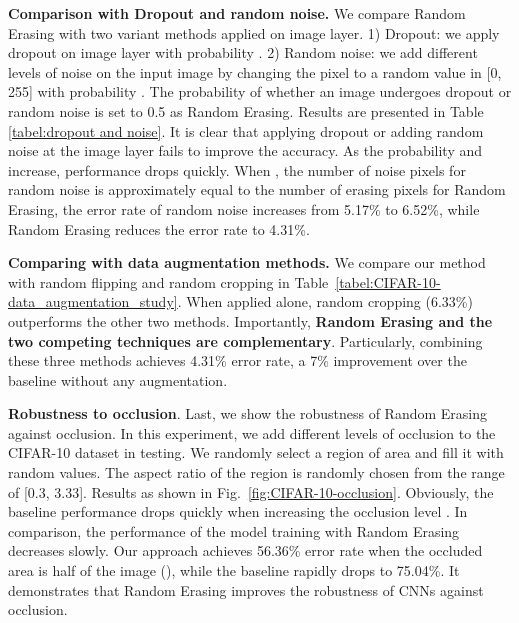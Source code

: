 \documentclass[10pt,twocolumn,letterpaper]{article}
\begin{document}
\textbf{Comparison with Dropout and random noise.} 
We compare Random Erasing with two variant methods applied on image layer. 1) Dropout: we apply dropout on image layer with probability . 2) Random noise: we add different levels of noise on the input image by changing the pixel to a random value in [0, 255] with probability . The probability of whether an image undergoes dropout or random noise is set to 0.5 as Random Erasing. Results are presented in Table \ref{tabel:dropout and noise}. 
It is clear that applying dropout or adding random noise at the image layer fails to improve the accuracy. As the probability  and  increase, performance drops quickly. When , the number of noise pixels for random noise is approximately equal to the number of erasing pixels for Random Erasing, the error rate of random noise increases from 5.17\% to 6.52\%, while Random Erasing reduces the error rate to 4.31\%.





\textbf{Comparing with data augmentation methods. }
We compare our method with random flipping and random cropping in Table~\ref{tabel:CIFAR-10-data_augmentation_study}. When applied alone, random cropping (6.33\%) outperforms the other two methods.
Importantly, \textbf{Random Erasing and the two competing techniques are complementary}. Particularly, combining these three methods achieves 4.31\% error rate,  a 7\% improvement over the baseline without any augmentation. 




















\textbf{Robustness to occlusion}.
Last, we show the robustness of Random Erasing against occlusion. In this experiment, we add different levels of occlusion to the CIFAR-10 dataset in testing. We randomly select a region of area and fill it with random values. The aspect ratio of the region is randomly chosen from the range of [0.3, 3.33]. Results as shown in Fig.~\ref{fig:CIFAR-10-occlusion}. Obviously, the baseline performance drops quickly when increasing the occlusion level . In comparison, the performance of the model training with Random Erasing decreases slowly. Our approach achieves 56.36\% error rate when the occluded area is half of the image (), while the baseline rapidly drops to 75.04\%. It demonstrates that Random Erasing improves the robustness of CNNs against occlusion.
\end{document}
